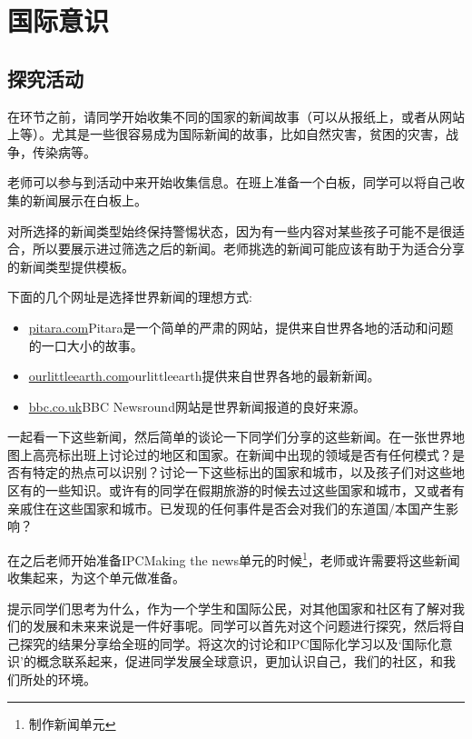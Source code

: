 \chapter{国际意识}




\section{探究活动}
    在环节之前，请同学开始收集不同的国家的新闻故事（可以从报纸上，或者从网站上等）。尤其是一些很容易成为国际新闻的故事，比如自然灾害，贫困的灾害，战争，传染病等。\par
    老师可以参与到活动中来开始收集信息。在班上准备一个白板，同学可以将自己收集的新闻展示在白板上。\par
    \begin{itemize}
      对所选择的新闻类型始终保持警惕状态，因为有一些内容对某些孩子可能不是很适合，所以要展示进过筛选之后的新闻。老师挑选的新闻可能应该有助于为适合分享的新闻类型提供模板。
    \end{itemize}  
    下面的几个网址是选择世界新闻的理想方式:\par
    \begin{itemize}
      \item  \href{http://www.pitara.com/news/news_world.asp}{pitara.com}Pitara是一个简单的严肃的网站，提供来自世界各地的活动和问题的一口大小的故事。
      \item  \href{http://www.ourlittleearth.com/}{ourlittleearth.com}ourlittleearth提供来自世界各地的最新新闻。
      \item  \href{http://www.bbc.co.uk/newsround}{bbc.co.uk}BBC Newsround网站是世界新闻报道的良好来源。
    \end{itemize}  
    一起看一下这些新闻，然后简单的谈论一下同学们分享的这些新闻。在一张世界地图上高亮标出班上讨论过的地区和国家。在新闻中出现的领域是否有任何模式？是否有特定的热点可以识别？讨论一下这些标出的国家和城市，以及孩子们对这些地区有的一些知识。或许有的同学在假期旅游的时候去过这些国家和城市，又或者有亲戚住在这些国家和城市。已发现的任何事件是否会对我们的东道国/本国产生影响？\par
    \begin{note}
      在之后老师开始准备IPCMaking the news单元的时候\footnote{制作新闻单元}，老师或许需要将这些新闻收集起来，为这个单元做准备。
    \end{note} 
    提示同学们思考为什么，作为一个学生和国际公民，对其他国家和社区有了解对我们的发展和未来来说是一件好事呢。同学可以首先对这个问题进行探究，然后将自己探究的结果分享给全班的同学。将这次的讨论和IPC国际化学习以及‘国际化意识’的概念联系起来，促进同学发展全球意识，更加认识自己，我们的社区，和我们所处的环境。\par

